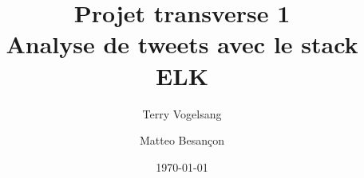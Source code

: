 \documentclass[12pt,a4paper,oneside, titlepage]{article}
\author{	Terry Vogelsang
					\and
					Matteo Besançon}
\title {Projet transverse 1 \\ \large Analyse de tweets avec le stack ELK}
\date{\today}
\begin{document}
	\renewcommand{\labelitemi}{$\bullet$}
	\maketitle
	\tableofcontents
	\newpage
\end{document}
